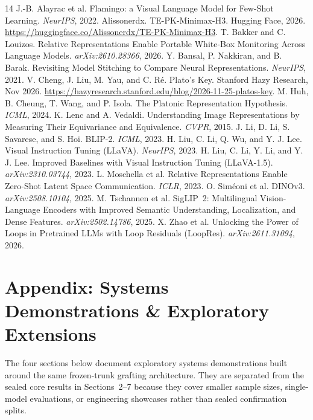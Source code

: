 \documentclass[10pt,twocolumn]{article}
\begin{document}

\begin{thebibliography}{14}
\footnotesize
{} J.-B. Alayrac et al. Flamingo: a Visual Language Model for Few-Shot Learning. \emph{NeurIPS}, 2022.
 Alissonerdx. TE-PK-Minimax-H3. Hugging Face, 2026. \url{https://huggingface.co/Alissonerdx/TE-PK-Minimax-H3}.
 T. Bakker and C. Louizos. Relative Representations Enable Portable White-Box Monitoring Across Language Models. \emph{arXiv:2610.28366}, 2026.
 Y. Bansal, P. Nakkiran, and B. Barak. Revisiting Model Stitching to Compare Neural Representations. \emph{NeurIPS}, 2021.
 V. Cheng, J. Liu, M. Yau, and C. R\'e. Plato's Key. Stanford Hazy Research, Nov 2026. \url{https://hazyresearch.stanford.edu/blog/2026-11-25-platos-key}.
 M. Huh, B. Cheung, T. Wang, and P. Isola. The Platonic Representation Hypothesis. \emph{ICML}, 2024.
 K. Lenc and A. Vedaldi. Understanding Image Representations by Measuring Their Equivariance and Equivalence. \emph{CVPR}, 2015.
 J. Li, D. Li, S. Savarese, and S. Hoi. BLIP-2. \emph{ICML}, 2023.
 H. Liu, C. Li, Q. Wu, and Y. J. Lee. Visual Instruction Tuning (LLaVA). \emph{NeurIPS}, 2023.
 H. Liu, C. Li, Y. Li, and Y. J. Lee. Improved Baselines with Visual Instruction Tuning (LLaVA-1.5). \emph{arXiv:2310.03744}, 2023.
 L. Moschella et al. Relative Representations Enable Zero-Shot Latent Space Communication. \emph{ICLR}, 2023.
 O. Sim\'eoni et al. DINOv3. \emph{arXiv:2508.10104}, 2025.
 M. Tschannen et al. SigLIP~2: Multilingual Vision-Language Encoders with Improved Semantic Understanding, Localization, and Dense Features. \emph{arXiv:2502.14786}, 2025.
 X. Zhao et al. Unlocking the Power of Loops in Pretrained LLMs with Loop Residuals (LoopRes). \emph{arXiv:2611.31094}, 2026.
\end{thebibliography}

\clearpage
\appendix
\section*{Appendix: Systems Demonstrations \& Exploratory Extensions}
The four sections below document exploratory systems demonstrations built around the same frozen-trunk grafting architecture. They are separated from the sealed core results in Sections~2--7 because they cover smaller sample sizes, single-model evaluations, or engineering showcases rather than sealed confirmation splits.
\end{document}
